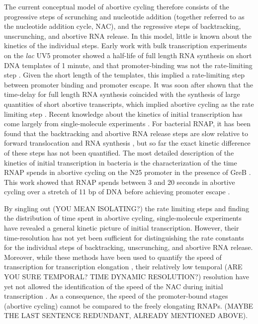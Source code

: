 The current conceptual model of abortive cycling therefore consists of the
progressive steps of scrunching and nucleotide addition (together referred to
as the nucleotide addition cycle, NAC), and the regressive steps of
backtracking, unscrunching, and abortive RNA release. In this model, little is
known about the kinetics of the individual steps. Early work with bulk
transcription experiments on the \textit{lac} UV5 promoter showed a half-life
of full length RNA synthesis on short DNA templates of 1 minute, and that
promoter-binding was not the rate-limiting step \cite{stefano_lac_1979}. Given
the short length of the templates, this implied a rate-limiting step between
promoter binding and promoter escape. It was soon after shown that the
time-delay for full length RNA synthesis coincided with the synthesis of large
quantities of short abortive transcripts, which implied abortive cycling as
the rate limiting step \cite{munson_abortive_1981}. Recent knowledge about the
kinetics of initial transcription has come largely from single-molecule
experiments \cite{revyakin_abortive_2006, kapanidis_initial_2006,
tang_real-time_2009, kapanidis_retention_2005, margeat_direct_2006}. For
bacterial RNAP, it has been found that the backtracking and abortive RNA
release steps are slow relative to forward translocation and RNA synthesis
\cite{revyakin_abortive_2006, margeat_direct_2006}, but so far the exact
kinetic difference of these steps has not been quantified. The most detailed
description of the kinetics of initial transcription in bacteria is the
characterization of the time RNAP spends in abortive cycling on the N25
promoter in the presence of GreB \cite{revyakin_abortive_2006}. This work
showed that RNAP spends between 3 and 20 seconds in abortive cycling over a
stretch of 11 bp of DNA before achieving promoter escape
\cite{revyakin_abortive_2006}.

By singling out (YOU MEAN ISOLATING?) the rate limiting steps and finding the distribution of time
spent in abortive cycling, single-molecule experiments have revealed a general
kinetic picture of initial transcription. However, their time-resolution has
not yet been sufficient for distinguishing the rate constants for the
individual steps of backtracking, unscrunching, and abortive RNA release. Moreover,
while these methods have been used to quantify the speed of transcription for
transcription elongation \cite{wang_force_1998,
tolic-norrelykke_diversity_2004}, their relatively low temporal (ARE YOU SURE TEMPORAL? TIME DYNAMIC RESOLUTION?) resolution have yet not
allowed the identification of the speed of the NAC during initial
transcription \cite{revyakin_abortive_2006, margeat_direct_2006}. As a
consequence, the speed of the promoter-bound stages (abortive cycling) cannot be compared to the freely elongating RNAPs. (MAYBE THE LAST SENTENCE REDUNDANT, ALREADY MENTIONED ABOVE).  

